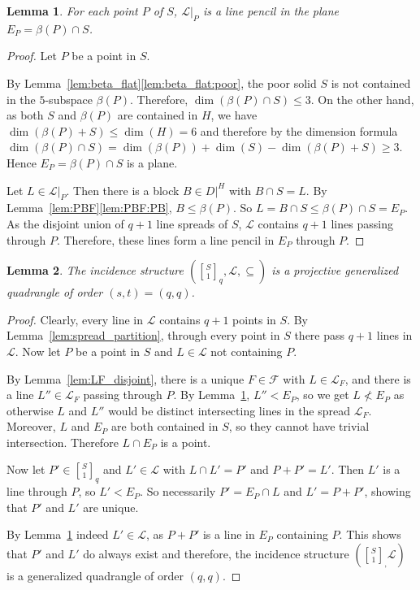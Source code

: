 \documentclass[a4paper,abstracton,12pt]{scrartcl}
\newcommand{\qbinom}[3]{\genfrac{[}{]}{0pt}{}{#1}{#2}_{#3}}
\newtheorem{lemma}{Lemma}[section]
\theoremstyle{definition}
\theoremstyle{remark}
\begin{document}
\begin{lemma}
\label{lem:pencil}
For each point $P$ of $S$, $\mathcal{L}|_P$ is a line pencil in the plane $E_P = \beta(P) \cap S$.
\end{lemma}

\begin{proof}
	Let $P$ be a point in $S$.

	By Lemma~\ref{lem:beta_flat}\ref{lem:beta_flat:poor}, the poor solid $S$ is not contained in the $5$-subspace $\beta(P)$.
	Therefore, $\dim(\beta(P)\cap S) \leq 3$.
	On the other hand, as both $S$ and $\beta(P)$ are contained in $H$, we have $\dim(\beta(P) + S) \leq \dim(H) = 6$ and therefore by the dimension formula $\dim(\beta(P)\cap S) = \dim(\beta(P)) + \dim(S) - \dim(\beta(P)+ S) \geq 3$.
	Hence $E_P = \beta(P) \cap S$ is a plane.

	Let $L\in \mathcal{L}|_P$.
	Then there is a block $B\in D|^H$ with $B\cap S = L$.
	By Lemma~\ref{lem:PBF}\ref{lem:PBF:PB}, $B \leq \beta(P)$.
	So $L = B \cap S \leq \beta(P) \cap S = E_P$.
	As the disjoint union of $q+1$ line spreads of $S$, $\mathcal{L}$ contains $q+1$ lines passing through $P$.
	Therefore, these lines form a line pencil in $E_P$ through $P$.
\end{proof}

\begin{lemma}
	\label{lem:gq}
	The incidence structure $(\qbinom{S}{1}{q},\mathcal{L}, \subseteq)$ is a projective generalized quadrangle of order $(s,t) = (q, q)$.
\end{lemma}

\begin{proof}
	Clearly, every line in $\mathcal{L}$ contains $q+1$ points in $S$.
	By Lemma~\ref{lem:spread_partition}, through every point in $S$ there pass $q + 1$ lines in $\mathcal{L}$.
	Now let $P$ be a point in $S$ and $L\in\mathcal{L}$ not containing $P$.

	By Lemma~\ref{lem:LF_disjoint}, there is a unique $F\in\mathcal{F}$ with $L\in\mathcal{L}_F$, and there is a line $L''\in\mathcal{L}_F$ passing through $P$.
	By Lemma~\ref{lem:pencil}, $L'' < E_P$, so we get $L \not < E_P$ as otherwise $L$ and $L''$ would be distinct intersecting lines in the spread $\mathcal{L}_F$.
	Moreover, $L$ and $E_P$ are both contained in $S$, so they cannot have trivial intersection.
	Therefore $L \cap E_P$ is a point.

	Now let $P'\in\qbinom{S}{1}{q}$ and $L'\in\mathcal{L}$ with $L \cap L' = P'$ and $P + P' = L'$.
	Then $L'$ is a line through $P$, so $L' < E_P$.
	So necessarily $P' = E_P \cap L$ and $L' = P + P'$, showing that $P'$ and $L'$ are unique.

	By Lemma~\ref{lem:pencil} indeed $L'\in\mathcal{L}$, as $P + P'$ is a line in $E_P$ containing $P$.
	This shows that $P'$ and $L'$ do always exist and therefore, the incidence structure $(\qbinom{S}{1},\mathcal{L})$ is a generalized quadrangle of order $(q,q)$.
\end{proof}
\end{document}
